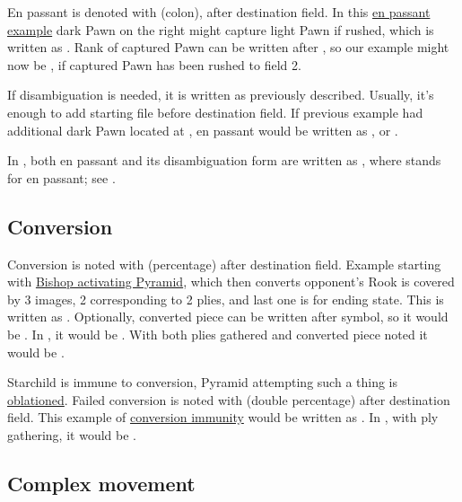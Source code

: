 En passant is denoted with \alg{:} (colon), after destination field. In this
\hyperref[fig:04_croatian_ties_en_passant]{en passant example} dark Pawn on the right might
capture light Pawn if rushed, which is written as . Rank of captured Pawn can be
written after \alg{:}, so our example might now be , if captured Pawn has been
rushed to field 2.

If disambiguation is needed, it is written as previously described. Usually, it's enough to
add starting file before destination field. If previous example had additional dark Pawn
located at , en passant would be written as , or .

In , both en passant and its disambiguation form are written as
, where  stands for en passant; see .

\vfill

\subsection*{Conversion}
\label{sec:Appendix/Notation/Conversion}

Conversion is noted with \alg{\%} (percentage) after destination field. Example starting
with \hyperref[fig:scn_ma_08_conversion_init]{Bishop activating Pyramid}, which then converts
opponent's Rook is covered by 3 images, 2 corresponding to 2 plies, and last one is for ending
state. This is written as . Optionally, converted piece can be written after
\alg{\%} symbol, so it would be . In , it would be
. With both plies gathered and converted piece noted it would be
\alg{[Bh9-d5]\~{}[Ad5-h5\%R]}.

Starchild is immune to conversion, Pyramid attempting such a thing is
\hyperref[sec:Terms/Oblation]{oblationed}. Failed conversion is noted with \alg{\%\%}
(double percentage) after destination field. This example of
\hyperref[fig:scn_o_14_starchild_conversion_immunity_init]{conversion immunity} would be
written as . In , with ply gathering, it would be
\alg{[Bs16-l23]\~{}[Al23-h23\%\%]}.

\subsection*{Complex movement}
\label{sec:Appendix/Notation/Complex movement}

